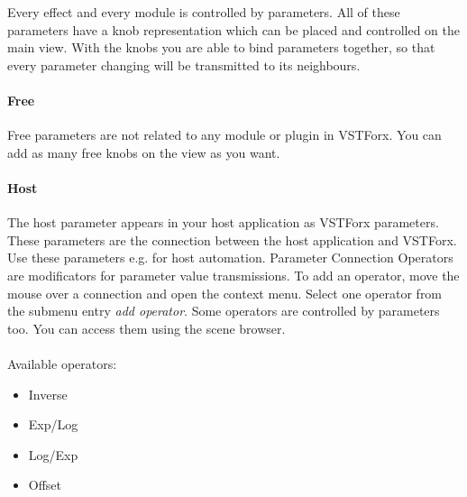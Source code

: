 Every effect and every module is controlled by parameters. All of these parameters have a knob representation which can be placed and controlled on the main view. With the knobs you are able to bind parameters together, so that every parameter changing will be transmitted to its neighbours.

\paragraph{Free}
Free parameters are not related to any module or plugin in VSTForx. You can add as many free knobs on the view as you want.
\paragraph{Host}
The host parameter appears in your host application as VSTForx parameters. These parameters are the connection between the host application and VSTForx. Use these parameters e.g. for host automation.
Parameter Connection Operators are modificators for parameter value transmissions. To add an operator, move the mouse over a connection and open the context menu. Select one operator from the submenu entry \emph{add operator}. 
Some operators are controlled by parameters too. You can access them using the scene browser.
\\\\
Available operators:
\begin{itemize}
\item Inverse
\item Exp/Log
\item Log/Exp
\item Offset
\end{itemize}